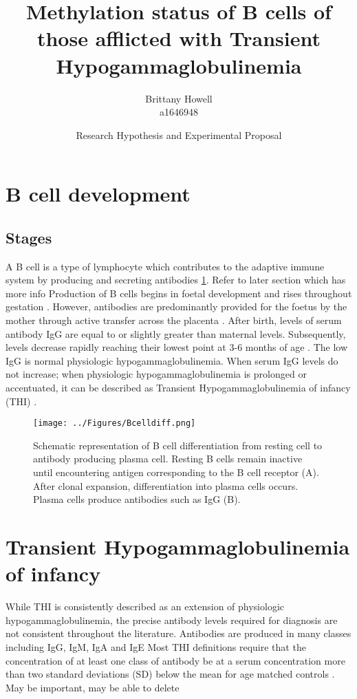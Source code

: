\documentclass[12pt]{article}
\title{Methylation status of B cells of those afflicted with Transient Hypogammaglobulinemia}
\date{Research Hypothesis and Experimental Proposal}
\author{Brittany Howell \\ a1646948}
\begin{document}
	\maketitle
	
	\section{B cell development}
	
	\subsection{Stages}
	
	A B cell is a type of lymphocyte which contributes to the adaptive immune system by producing and secreting antibodies \citep{Cooper15} \ref{fig:BcellDiff}.
	{\Huge Refer to later section which has more info}
	Production of B cells begins in foetal development and rises throughout gestation \citep{Rechavi15}.
	However, antibodies are predominantly provided for the foetus by the mother through active transfer across the placenta \citep{Kohler66, Dalal98}.
	After birth, levels of serum antibody IgG are equal to or slightly greater than maternal levels. 
	Subsequently, levels decrease rapidly reaching their lowest point at 3-6 months of age \citep{Dressler89}.
	The low IgG is normal physiologic hypogammaglobulinemia.
	When serum IgG levels do not increase; when physiologic hypogammaglobulinemia is prolonged or accentuated, it can be described as Transient Hypogammaglobulinemia of infancy (THI) \citep{Gitlin56}.
	
	\begin{figure}[tbh]
		\centering
		\texttt{[image: ../Figures/Bcelldiff.png]}
		\caption{Schematic representation of B cell differentiation from resting cell to antibody producing plasma cell. Resting B cells remain inactive until encountering antigen corresponding to the B cell receptor (A). After clonal expansion, differentiation into plasma cells occurs. Plasma cells produce antibodies such as IgG (B).}
		\label{fig:BcellDiff}
	\end{figure}
	
	
	\section{Transient Hypogammaglobulinemia of infancy}
	
	While THI is consistently described as an extension of physiologic hypogammaglobulinemia, the precise antibody levels required for diagnosis are not consistent throughout the literature. 
	Antibodies are produced in many classes including IgG, IgM, IgA and IgE \citep{Cooper15}
	Most THI definitions require that the concentration of at least one class of antibody be at a serum concentration more than two standard deviations (SD) below the mean for age matched controls \citep{Tiller78,McGeady87,Dressler89,Dalal98}. 
	{\Huge May be important, may be able to delete}
	
\end{document}
